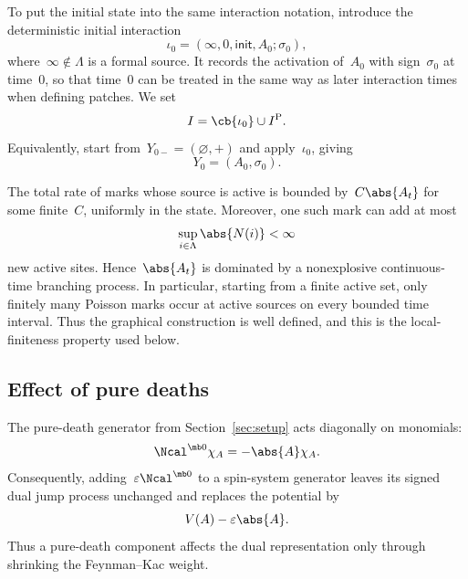 To put the initial state into the same interaction notation, introduce the
deterministic initial interaction
\begin{equation}
\label{eq:initial-interaction}
\iota_0
=
(\infty,0,\mathsf{init},A_0;\sigma_0),
\end{equation}
where~$\infty\notin\Lambda$ is a formal source. It records the activation of~$A_0$
with sign~$\sigma_0$ at time~$0$, so that time~$0$ can be treated in the same
way as later interaction times when defining patches. We set
\begin{equation*}
I=\cb{\iota_0}\cup I^{\mathrm P}.
\end{equation*}
Equivalently, start from~$Y_{0-}=(\varnothing,+)$ and apply~$\iota_0$, giving
\begin{equation*}
Y_0=(A_0,\sigma_0).
\end{equation*}

The total rate of marks whose source is active is bounded by~$C\abs{A_t}$ for
some finite~$C$, uniformly in the state. Moreover, one such mark can add at most
\begin{equation*}
\sup_{i\in\Lambda}\abs{N(i)}<\infty
\end{equation*}
new active sites. Hence~$\abs{A_t}$ is dominated by a nonexplosive
continuous-time branching process. In particular, starting from a finite active
set, only finitely many Poisson marks occur at active sources on every bounded
time interval. Thus the graphical construction is well defined, and this is the
local-finiteness property used below.

\subsection{Effect of pure deaths}

The pure-death generator from Section~\ref{sec:setup} acts diagonally on
monomials:
\begin{equation*}
\Ncal^{\mb 0}\chi_A=-\abs{A}\chi_A.
\end{equation*}
Consequently, adding~$\varepsilon\Ncal^{\mb 0}$ to a spin-system generator
leaves its signed dual jump process unchanged and replaces the potential by
\begin{equation*}
V(A)-\varepsilon\abs{A}.
\end{equation*}
Thus a pure-death component affects the dual representation only through shrinking the
Feynman--Kac weight.
